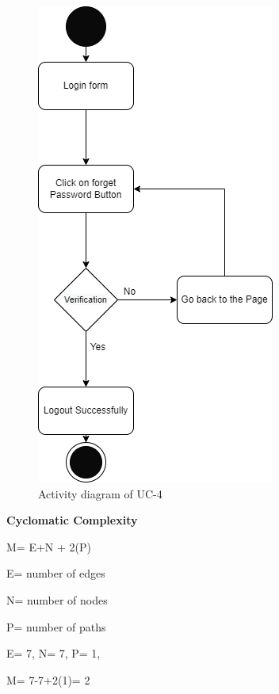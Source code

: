 \begin{figure}[H]
    \centering
    \includegraphics[scale=0.7]{./diagrams/Activity Diagram/ad-04.png}
    \caption{Activity diagram of UC-4}
    \label{fig:act-04}

\end{figure}

\textbf{Cyclomatic Complexity}

M= E+N + 2(P)

E= number of edges

N= number of nodes

P= number of paths

E= 7,
N= 7,
P= 1,

M= 7-7+2(1)= 2

